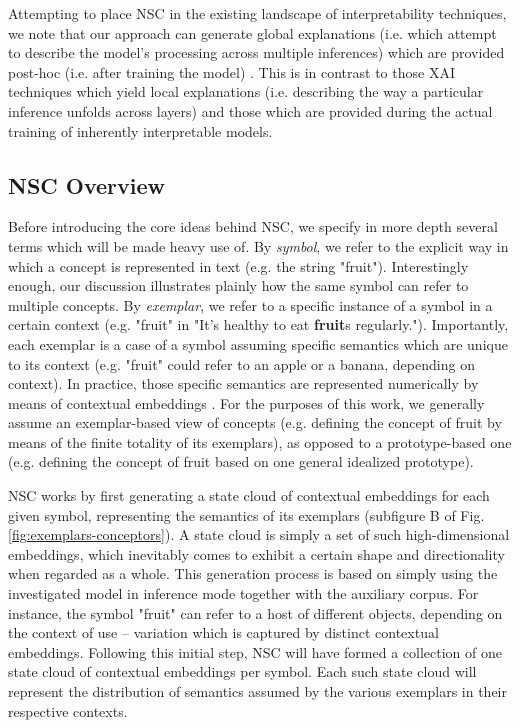 Attempting to place NSC in the existing landscape of interpretability techniques, we note that our approach can generate global explanations (i.e. which attempt to describe the model's processing across multiple inferences) which are provided post-hoc (i.e. after training the model) \citep{danilevsky_survey_nodate}. This is in contrast to those XAI techniques which yield local explanations (i.e. describing the way a particular inference unfolds across layers) and those which are provided during the actual training of inherently interpretable models.

\subsection{NSC Overview}

Before introducing the core ideas behind NSC, we specify in more depth several terms which will be made heavy use of. By \textit{symbol}, we refer to the explicit way in which a concept is represented in text (e.g. the string "fruit"). Interestingly enough, our discussion illustrates plainly how the same symbol can refer to multiple concepts. By \textit{exemplar}, we refer to a specific instance of a symbol in a certain context (e.g. "fruit" in "It's healthy to eat \textbf{fruit}s regularly."). Importantly, each exemplar is a case of a symbol assuming specific semantics which are unique to its context (e.g. "fruit" could refer to an apple or a banana, depending on context). In practice, those specific semantics are represented numerically by means of contextual embeddings \citep{devlin_bert_nodate}. For the purposes of this work, we generally assume an exemplar-based view of concepts (e.g. defining the concept of fruit by means of the finite totality of its exemplars), as opposed to a prototype-based one (e.g. defining the concept of fruit based on one general idealized prototype).

NSC works by first generating a state cloud of contextual embeddings for each given symbol, representing the semantics of its exemplars (subfigure B of Fig. \ref{fig:exemplars-conceptors}). A state cloud is simply a set of such high-dimensional embeddings, which inevitably comes to exhibit a certain shape and directionality when regarded as a whole. This generation process is based on simply using the investigated model in inference mode together with the auxiliary corpus. For instance, the symbol "fruit" can refer to a host of different objects, depending on the context of use -- variation which is captured by distinct contextual embeddings. Following this initial step, NSC will have formed a collection of one state cloud of contextual embeddings per symbol. Each such state cloud will represent the distribution of semantics assumed by the various exemplars in their respective contexts.

